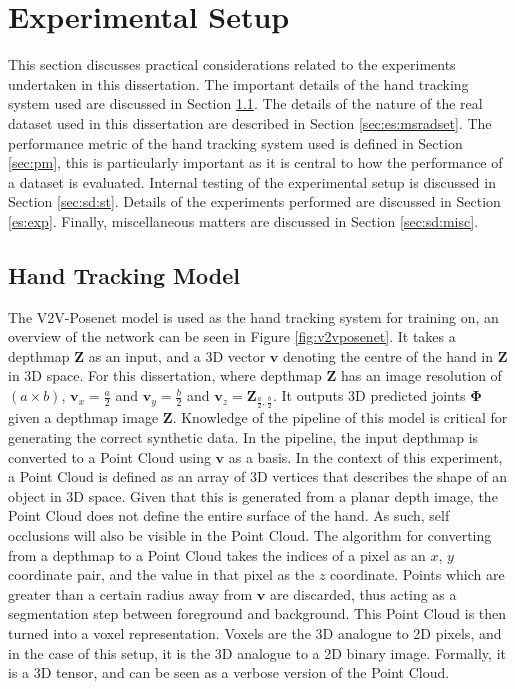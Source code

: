 \chapter{Experimental Setup}

This section discusses practical considerations related to the experiments undertaken in this dissertation. The important details of the hand tracking system used are discussed in Section \ref{sec:htm}. The details of the nature of the real dataset used in this dissertation are described in Section \ref{sec:es:msradset}. The performance metric of the hand tracking system used is defined in Section \ref{sec:pm}, this is particularly important as it is central to how the performance of a dataset is evaluated. Internal testing of the experimental setup is discussed in Section \ref{sec:sd:st}. Details of the experiments performed are discussed in Section \ref{es:exp}. Finally, miscellaneous matters are discussed in Section \ref{sec:sd:misc}.

\label{chap:es}
\section{Hand Tracking Model}
\label{sec:htm}
The V2V-Posenet model\cite{moon2018v2v} is used as the hand tracking system for training on, an overview of the network can be seen in Figure \ref{fig:v2vposenet}. It takes a depthmap $\bm{Z}$ as an input, and a 3D vector $\bm{v}$ denoting the centre of the hand in $\bm{Z}$ in 3D space. For this dissertation, where depthmap $\bm{Z}$ has an image resolution of $(a\times b)$, $\bm{v}_x = \frac{a}{2}$ and $\bm{v}_y=\frac{b}{2}$ and $\bm{v}_z = \bm{Z}_{\frac{a}{2},\frac{b}{2}}$. It outputs 3D predicted joints $\bm{\Phi}$ given a depthmap image $\bm{Z}$. Knowledge of the pipeline of this model is critical for generating the correct synthetic data. In the pipeline, the input depthmap is converted to a Point Cloud using $\bm{v}$ as a basis. In the context of this experiment, a Point Cloud is defined as an array of 3D vertices that describes the shape of an object in 3D space. Given that this is generated from a planar depth image, the Point Cloud does not define the entire surface of the hand. As such, self occlusions will also be visible in the Point Cloud. The algorithm for converting from a depthmap to a Point Cloud takes the indices of a pixel as an $x$, $y$ coordinate pair, and the value in that pixel as the $z$ coordinate. Points which are greater than a certain radius away from $\bm{v}$ are discarded, thus acting as a segmentation step between foreground and background. This Point Cloud is then turned into a voxel representation. Voxels are the 3D analogue to 2D pixels, and in the case of this setup, it is the 3D analogue to a 2D binary image. Formally, it is a 3D tensor, and can be seen as a verbose version of the Point Cloud.

